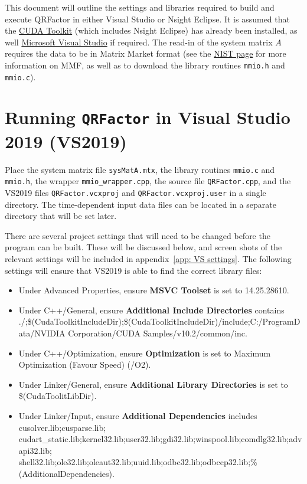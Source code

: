\documentclass[11pt,letterpaper]{article}
\begin{document}
This document will outline the settings and libraries required to build and execute QRFactor in either Visual Studio or Nsight Eclipse. It is assumed that the \href{https://developer.nvidia.com/cuda-downloads}{CUDA Toolkit} (which includes Nsight Eclipse) has already been installed, as well \href{https://visualstudio.microsoft.com/downloads/}{Microsoft Visual Studio} if required. The read-in of the system matrix $A$ requires the data to be in Matrix Market format (see the \href{https://math.nist.gov/MatrixMarket/formats.html}{NIST page} for more information on MMF, as well as to download the library routines \texttt{mmio.h} and \texttt{mmio.c}).

\section{Running \texttt{QRFactor} in Visual Studio 2019 (VS2019)}
\label{sec: vs}

Place the system matrix file \texttt{sysMatA.mtx}, the library routines \texttt{mmio.c} and \texttt{mmio.h}, the wrapper \texttt{mmio\_wrapper.cpp}, the source file \texttt{QRFactor.cpp}, and the VS2019 files \texttt{QRFactor.vcxproj} and \texttt{QRFactor.vcxproj.user} in a single directory. The time-dependent input data files can be located in a separate directory that will be set later.

There are several project settings that will need to be changed before the program can be built. These will be discussed below, and screen shots of the relevant settings will be included in appendix~\ref{app: VS settings}. The following settings will ensure that VS2019 is able to find the correct library files:
\begin{itemize}
\item Under Advanced Properties, ensure {\bf MSVC Toolset} is set to 14.25.28610.
\item Under C++/General, ensure {\bf Additional Include Directories} contains ./;\$(CudaToolkitIncludeDir);\$(CudaToolkitIncludeDir)/include;C:/ProgramData/NVIDIA Corporation/CUDA Samples/v10.2/common/inc.
\item Under C++/Optimization, ensure {\bf Optimization} is set to Maximum Optimization (Favour Speed) (/O2).
\item Under Linker/General, ensure {\bf Additional Library Directories} is set to \$(CudaToolitLibDir).
\item Under Linker/Input, ensure {\bf Additional Dependencies} includes cusolver.lib;cusparse.lib; cudart\_static.lib;kernel32.lib;user32.lib;gdi32.lib;winspool.lib;comdlg32.lib;advapi32.lib; \\ shell32.lib;ole32.lib;oleaut32.lib;uuid.lib;odbc32.lib;odbccp32.lib;\%(AdditionalDependencies).
\end{itemize}
\end{document}
